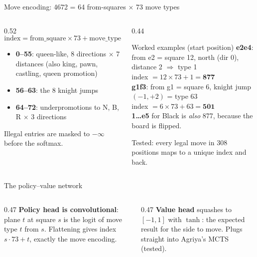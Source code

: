 \documentclass[aspectratio=169, 10pt]{beamer}
\begin{document}
\begin{frame}{Move encoding: 4672 = 64 from-squares $\times$ 73 move types}
  \begin{columns}[T]
    \begin{column}{0.52\textwidth}
      \[
        \text{index} = \text{from\_square} \times 73 + \text{move\_type}
      \]
      \begin{itemize}
        \item \textbf{0--55}: queen-like, 8 directions $\times$ 7 distances (also king,
          pawn, castling, queen promotion)
        \item \textbf{56--63}: the 8 knight jumps
        \item \textbf{64--72}: underpromotions to N, B, R $\times$ 3 directions
      \end{itemize}
      Illegal entries are masked to $-\infty$ before the softmax.
    \end{column}
    \begin{column}{0.44\textwidth}
      \begin{block}{Worked examples (start position)}
        \small
        \textbf{e2e4}: from e2 = square 12, north (dir 0), distance 2 $\Rightarrow$ type 1\\
        index $= 12 \times 73 + 1 = \mathbf{877}$\\[4pt]
        \textbf{g1f3}: from g1 = square 6, knight jump $(-1,+2)$ = type 63\\
        index $= 6 \times 73 + 63 = \mathbf{501}$\\[4pt]
        \textbf{1\ldots e5} for Black is \emph{also} 877, because the board is flipped.
      \end{block}
      {\scriptsize Tested: every legal move in 308 positions maps to a unique index and back.}
    \end{column}
  \end{columns}
\end{frame}

\begin{frame}{The policy--value network}
  \centering
  \resizebox{\textwidth}{!}{}
  \bigskip

  \begin{columns}[T]
    \begin{column}{0.47\textwidth}
      \small
      \textbf{Policy head is convolutional}: plane $t$ at square $s$ is the logit of move type
      $t$ from $s$. Flattening gives index $s \cdot 73 + t$, exactly the move encoding.
    \end{column}
    \begin{column}{0.47\textwidth}
      \small
      \textbf{Value head} squashes to $[-1, 1]$ with $\tanh$: the expected result for the side
      to move. Plugs straight into Agriya's MCTS (tested).
    \end{column}
  \end{columns}
\end{frame}
\end{document}
